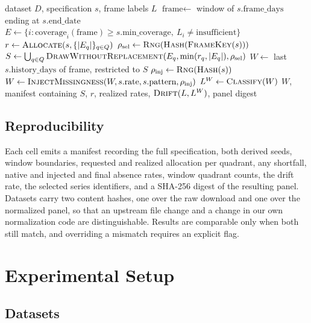 \documentclass[11pt]{article}
\begin{document}
\begin{algorithm}[t]
\caption{Drawing one cell of the scarcity grid}
\label{alg:sample}
\begin{algorithmic}[1]
\Require dataset $D$, specification $s$, frame labels $L$
\State $\text{frame} \gets$ window of $s.\text{frame\_days}$ ending at $s.\text{end\_date}$
\State $E \gets \{i : \text{coverage}_i(\text{frame}) \ge s.\text{min\_coverage},\ L_i \ne \text{insufficient}\}$
\State $r \gets \textsc{Allocate}(s, \{|E_q|\}_{q \in Q})$ 
\State $\rho_{\text{sel}} \gets \textsc{Rng}(\textsc{Hash}(\textsc{FrameKey}(s)))$ 
\State $S \gets \bigcup_{q \in Q} \textsc{DrawWithoutReplacement}(E_q, \min(r_q, |E_q|), \rho_{\text{sel}})$
\State $W \gets$ last $s.\text{history\_days}$ of frame, restricted to $S$
\State $\rho_{\text{inj}} \gets \textsc{Rng}(\textsc{Hash}(s))$ 
\State $W \gets \textsc{InjectMissingness}(W, s.\text{rate}, s.\text{pattern}, \rho_{\text{inj}})$
\State $L^{W} \gets \textsc{Classify}(W)$ 
\State \Return $W$, manifest containing $S$, $r$, realized rates, $\textsc{Drift}(L, L^{W})$, panel digest
\end{algorithmic}
\end{algorithm}

\subsection{Reproducibility}

Each cell emits a manifest recording the full specification, both derived seeds,
window boundaries, requested and realized allocation per quadrant, any shortfall,
native and injected and final absence rates, window quadrant counts, the drift
rate, the selected series identifiers, and a SHA-256 digest of the resulting
panel. Datasets carry two content hashes, one over the raw download and one over
the normalized panel, so that an upstream file change and a change in our own
normalization code are distinguishable. Results are comparable only when both
still match, and overriding a mismatch requires an explicit flag.

\section{Experimental Setup}

\subsection{Datasets}
\end{document}
